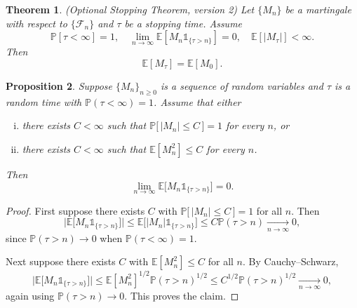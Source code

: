 \documentclass{tufte-handout}
\newcommand*\E{\mathbb{E}}
\renewcommand*\P{\mathbb{P}}
\newtheorem{thm}{Theorem}[subsection]
\newtheorem{prop}[thm]{Proposition}
\theoremstyle{definition}
\begin{document}
\begin{thm}
	(Optional Stopping Theorem, version 2) Let $\{M_n\}$ be a martingale with respect to $\{\mathscr{F}_n\}$ and $\tau$ be a stopping time. Assume \[
		\P\left[\tau < \infty\right] = 1, \quad \lim\limits_{n \to \infty} \E\left[M_n \mathds{1}_{\{\tau > n\}}\right] = 0, \quad \E\left[\left| M_\tau \right|\right] < \infty
	.\] Then \[
		\E\left[M_\tau\right] = \E\left[M_0\right] 
	.\] 
\end{thm}

\begin{prop}
	\label{prop:Mn-tail}
	Suppose $\{M_n\}_{n \ge 0}$ is a sequence of random variables and $\tau$ is a
	random time with $\P(\tau < \infty) = 1$. Assume that either
	\begin{enumerate}[(i)]
		\item there exists $C < \infty$ such that $\P\big[\,|M_n| \le C\,\big] = 1$
		      for every $n$, or
		\item there exists $C < \infty$ such that $\E\left[M_n^2\right] \le C$ for
		      every $n$.
	\end{enumerate}
	Then
	\[
		\lim_{n \to \infty} \E\big[ M_n \mathds{1}_{\{\tau > n\}} \big] = 0.
	\]
\end{prop}

\begin{proof}
	First suppose there exists $C$ with $\P\big[\,|M_n| \le C\,\big] = 1$ for all
	$n$. Then
	\[
		\big| \E\big[ M_n \mathds{1}_{\{\tau > n\}} \big] \big|
		\le \E\big[ |M_n| \mathds{1}_{\{\tau > n\}} \big]
		\le C \P(\tau > n) \xrightarrow[n \to \infty]{} 0,
	\]
	since $\P(\tau > n) \to 0$ when $\P(\tau < \infty) = 1$.

	Next suppose there exists $C$ with $\E\left[M_n^2\right] \le C$ for all $n$.
	By Cauchy–Schwarz,
	\[
		\big| \E\big[ M_n \mathds{1}_{\{\tau > n\}} \big] \big|
		\le \E\left[M_n^2\right]^{1/2} \P(\tau > n)^{1/2}
		\le C^{1/2} \P(\tau > n)^{1/2} \xrightarrow[n \to \infty]{} 0,
	\]
	again using $\P(\tau > n) \to 0$. This proves the claim.
\end{proof}
\end{document}
